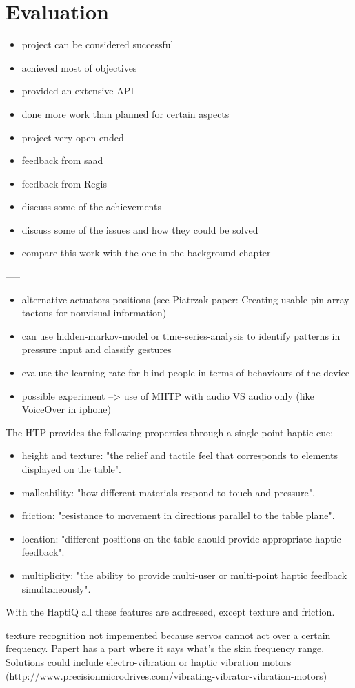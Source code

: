 \chapter{Evaluation}

\begin{itemize}
	\item project can be considered successful
    \item achieved most of objectives
    \item provided an extensive API
    \item done more work than planned for certain aspects
    \item project very open ended
    \item feedback from saad
    \item feedback from Regis
    \item discuss some of the achievements
    \item discuss some of the issues and how they could be solved
    \item compare this work with the one in the background chapter
\end{itemize}


-----

\begin{itemize}
    \item alternative actuators positions (see Piatrzak paper: Creating usable pin array tactons for nonvisual information)
    \item can use hidden-markov-model or time-series-analysis to identify patterns in pressure input and classify gestures
    \item evalute the learning rate for blind people in terms of behaviours of the device
    \item possible experiment --> use of MHTP with audio VS audio only (like VoiceOver in iphone)
\end{itemize}

The HTP provides the following properties through a single point haptic cue:
\begin{itemize}
	\item height and texture: "the relief and tactile feel that corresponds to elements displayed on the table".
    \item malleability: "how different materials respond to touch and pressure".
    \item friction: "resistance to movement in directions parallel to the table plane".
    \item location: "different positions on the table should provide appropriate haptic feedback".
    \item multiplicity: "the ability to provide multi-user or multi-point haptic feedback simultaneously". \cite{marquardt2009haptic}
\end{itemize}

With the HaptiQ all these features are addressed, except texture and friction. 

texture recognition not impemented because servos cannot act over a certain frequency. Papert \cite{brown2005first} has a part where it says what's the skin frequency range. Solutions could include electro-vibration or haptic vibration motors (http://www.precisionmicrodrives.com/vibrating-vibrator-vibration-motors)
